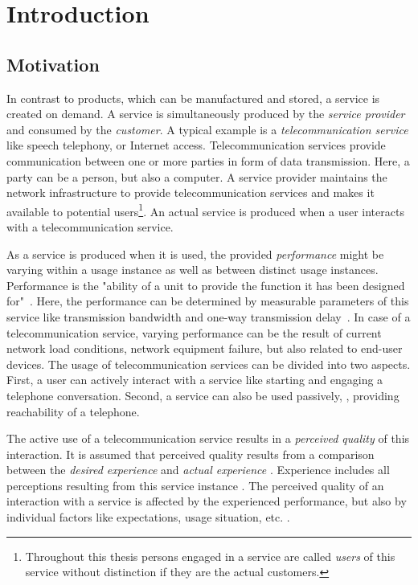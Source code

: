 \chapter{Introduction}\label{chap:01}

\section{Motivation}
In contrast to products, which can be manufactured and stored, a service is created on demand.
A service is simultaneously produced by the \emph{service provider} and consumed by the \emph{customer}.
A typical example is a \emph{telecommunication service} like speech telephony, or Internet access.
Telecommunication services provide communication between one or more parties in form of data transmission.
Here, a party can be a person, but also a computer.
A service provider maintains the network infrastructure to provide telecommunication services and makes it available to potential users\footnote{Throughout this thesis persons engaged in a service are called \emph{users} of this service without distinction if they are the actual customers.}.
An actual service is produced when a user interacts with a telecommunication service.

As a service is produced when it is used, the provided \emph{performance} might be varying within a usage instance as well as between distinct usage instances.
Performance is the "ability of a unit to provide the function it has been designed for"~\citep[][p.~360]{moller_quality_2005}.
Here, the performance can be determined by measurable parameters of this service like transmission bandwidth and one-way transmission delay~\citep[][p.~12]{moller_assessment_2000}.
In case of a telecommunication service, varying performance can be the result of current network load conditions, network equipment failure, but also related to end-user devices.
The usage of telecommunication services can be divided into two aspects.
First, a user can actively interact with a service like starting and engaging a telephone conversation.
Second, a service can also be used passively, \eg, providing reachability of a telephone.

The active use of a telecommunication service results in a \emph{perceived quality} of this interaction.
It is assumed that perceived quality results from a comparison between the \emph{desired experience} and \emph{actual experience} \citep[][p.~13]{raake_quality_2014}. %
Experience includes all perceptions resulting from this service instance \citep[][p.~13]{raake_quality_2014}.
The perceived quality of an interaction with a service is affected by the experienced performance, but also by individual factors like expectations, usage situation, etc. \citep[\eg,][p.~55ff.]{reiter_factors_2014}.

